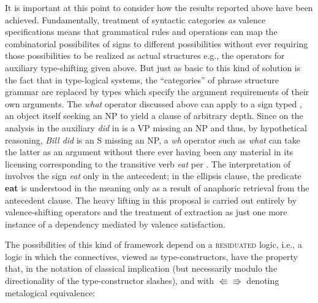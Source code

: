 \documentclass[output=paper,colorlinks,citecolor=brown]{langscibook}
\begin{document}
It is important at this point to consider how the results reported
above have been achieved. Fundamentally, treatment of syntactic
categories \textsl{as} valence specifications means that grammatical
rules and operations can map the combinatorial possibilites of signs
to different possibilities without ever requiring those possibilities
to be realized as actual structures e.g., the operators for auxiliary
type-shifting given above. But just as basic to this kind of solution
is the fact that in type-logical systems, the ``categories'' of phrase
structure grammar are replaced by types which specify the argument
requirements of their own arguments. The \textit{what} operator discussed
above can apply to a sign typed , an object itself seeking an NP
to yield a clause of arbitrary depth. Since on the analysis in
 the auxiliary \textit{did} in  is a VP
missing an NP and thus, by hypothetical reasoning, \textit{Bill did} is an S
missing an NP, a \textit{wh} operator such as \textit{what} can take the latter as
an argument without there ever having been any material in its
licensing corresponding to the transitive verb \textit{eat} per
. The interpretation of  involves
the sign \textit{eat} only in the antecedent; in the ellipsis clause, the
predicate \textbf{eat} is understood in the meaning only as a result of
anaphoric retrieval from the antecedent clause. The heavy lifting in
this proposal is carried out entirely by valence-shifting operators
and the treatment of extraction as just one more instance of a
dependency mediated by valence satisfaction.

The possibilities of this kind of framework depend on a \textsc{residuated}
logic, i.e., a logic in which the connectives, viewed as
type-constructors, have the property that, in the notation of
classical implication (but necessarily modulo the directionality of the
type-constructor slashes), and with $\Lleftarrow\!\Rrightarrow$
denoting metalogical equivalence:
\end{document}
